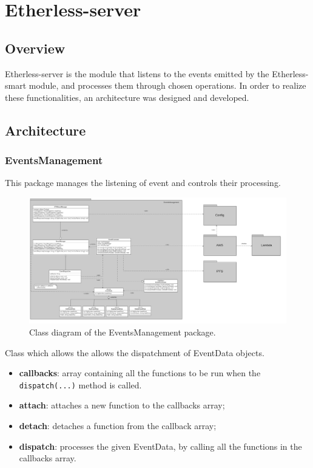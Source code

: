 \section{Etherless-server}
	\subsection{Overview} %
	Etherless-server is the module that listens to the events emitted by the Etherless-smart module, and processes them through chosen operations. In order to realize these functionalities, an architecture was designed and developed.
	\subsection{Architecture}
	\subsubsection{EventsManagement}
	This package manages the listening of event and controls their processing.
	\begin{figure} [h!]
		\centering
		\includegraphics[width=1.1\linewidth]{diagrammi/etherless-server/Eventsmanager}
		\caption{Class diagram of the EventsManagement package.}
	\end{figure}
	Class which allows the allows the dispatchment of EventData objects.
	\begin{itemize}
		\item \textbf{callbacks}: array containing all the functions to be run when the \texttt{dispatch(...)} method is called.
	\end{itemize}
	\begin{itemize}
		\item \textbf{attach}: attaches a new function to the callbacks array;
		\item \textbf{detach}: detaches a function from the callback array;
		\item \textbf{dispatch}: processes the given EventData, by calling all the functions in the callbacks array.
	\end{itemize}
